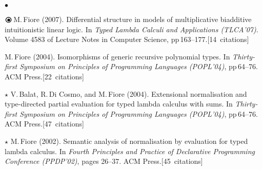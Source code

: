 \documentclass[11pt,twocolumn]{article}
\newenvironment{mybigitemize}
  {\begin{list}{$\bullet$}
  {\setlength{\topsep}{2pt}
   \setlength{\partopsep}{2pt}
   \setlength{\itemsep}{2.5pt}
   \setlength{\parsep}{2.5pt}
   \setlength{\leftmargin}{1em}
   \setlength{\labelwidth}{.5em}}}
  {\end{list}}
\newcommand{\obullet}{\mbox{$\raisebox{-.85mm}{\huge$\circ$}\hspace*{-2.6mm}\bullet$}}
\begin{document}
\begin{mybigitemize}

\item[$\obullet$]
  M.\,Fiore (2007).  Differential structure in models of
  multiplicative biadditive intuitionistic linear logic.  In
  \emph{Typed Lambda Calculi and Applications (TLCA'07)}.  Volume
  4583 of Lecture Notes in Computer Science,
  pp\,163--177.\mbox{}\hfill{\small[14~citations]}



\item
  M.\,Fiore (2004).  Isomorphisms of generic recursive polynomial
  types.   In \emph{Thirty-first Symposium on Principles of
    Programming Languages (POPL'04)}, pp\,64--76.  ACM
  Press.\mbox{}\hfill{\small[22~citations]}

\item[$\star$]
  V.\,Balat, R.\,Di Cosmo, and M.\,Fiore (2004).  Extensional
  normalisation and type-directed partial evaluation for typed lambda
  calculus with sums.   
  In \emph{Thirty-first Symposium on Principles
    of Programming Languages (POPL'04)}, pp\,64--76.  ACM
  Press.\mbox{}\hfill{\small[47~citations]}

\item[$\star$]
  M.\,Fiore (2002).  Semantic analysis of normalisation by evaluation
  for typed lambda calculus.  In \emph{Fourth Principles and Practice
    of Declarative Programming Conference (PPDP'02)}, pages 26--37. 
  ACM Press.\mbox{}\hfill{\small[45~citations]}

\end{mybigitemize}
\end{document}
